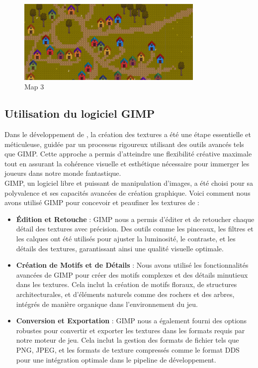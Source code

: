   \begin{figure}[H]
      \centering
      \includegraphics[width=0.8\textwidth]{assets/map3.png}
      \caption{Map 3}
      \label{fig:website1}
  \end{figure}

\subsection{Utilisation du logiciel GIMP}

Dans le développement de \gameName, la création des textures a été une étape essentielle et méticuleuse, 
guidée par un processus rigoureux utilisant des outils avancés tels que GIMP. Cette approche a permis d'atteindre une flexibilité
 créative maximale tout en assurant la cohérence visuelle et esthétique nécessaire pour immerger les joueurs dans notre monde fantastique.
\\

GIMP, un logiciel libre et puissant de manipulation d'images, a été choisi pour sa polyvalence et ses capacités avancées de création graphique.
 Voici comment nous avons utilisé GIMP pour concevoir et peaufiner les textures de \gameName :
\\

\begin{itemize}
    \item \textbf{Édition et Retouche} : GIMP nous a permis d'éditer et de retoucher chaque détail des textures avec précision. Des outils comme les pinceaux, les filtres et les calques ont été utilisés pour ajuster la luminosité, le contraste, et les détails des textures, garantissant ainsi une qualité visuelle optimale.
    \\

    \item \textbf{Création de Motifs et de Détails} : Nous avons utilisé les fonctionnalités avancées de GIMP pour créer des motifs complexes et des détails minutieux dans les textures. Cela inclut la création de motifs floraux, de structures architecturales, et d'éléments naturels comme des rochers et des arbres, intégrés de manière organique dans l'environnement du jeu.
    \\

    \item \textbf{Conversion et Exportation} : GIMP nous a également fourni des options robustes pour convertir et exporter les textures dans les formats requis par notre moteur de jeu. Cela inclut la gestion des formats de fichier tels que PNG, JPEG, et les formats de texture compressés comme le format DDS pour une intégration optimale dans le pipeline de développement.
\end{itemize}

